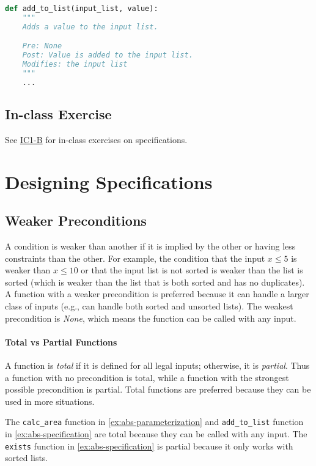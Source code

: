 \documentclass[oneside,11pt,dvipsnames]{book}
\begin{document}
\begin{lstlisting}[language=Python, keywordstyle=\color{blue}, commentstyle=\color{green!60!black}, stringstyle=\color{red}, basicstyle=\ttfamily\scriptsize]
    def add_to_list(input_list, value):
    """
    Adds a value to the input list.

    Pre: None
    Post: Value is added to the input list.
    Modifies: the input list
    """
    ... 

\end{lstlisting}


\subsection{In-class Exercise}
See \href{https://nguyenthanhvuh.github.io/class-oo/assignments#ic1-b}{IC1-B} for in-class exercises on specifications.

\section{Designing Specifications}\label{sec:design-specifications}

\subsection{Weaker Preconditions}
A condition is weaker than another if it is implied by the other or having less constraints than the other. For example, the condition that the input $x \le 5$ is weaker than $x \le 10$ or that the input list is not sorted is weaker than the list is sorted (which is weaker than the list that is both sorted and has no duplicates).  A function with a weaker precondition is preferred because it can handle a larger class of inputs (e.g., can handle both sorted and unsorted lists). The weakest precondition is \emph{None}, which means the function can be called with any input.

\paragraph{Total vs Partial Functions}

A function is \emph{total} if it is defined for all legal inputs; otherwise, it is \emph{partial}. Thus a function with no precondition is total, while a function with the strongest possible precondition is partial.  Total functions are preferred because they can be used in more situations.

The \texttt{calc\_area} function in \autoref{ex:abs-parameterization} and \texttt{add\_to\_list} function in \autoref{ex:abs-specification} are total because they can be called with any input. The \texttt{exists} function in \autoref{ex:abs-specification} is partial because it only works with sorted lists.
\end{document}
